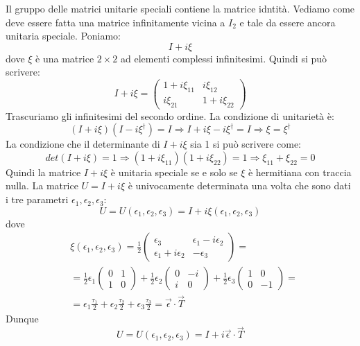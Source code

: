  Il gruppo delle matrici unitarie speciali contiene la
matrice idntità. Vediamo come deve essere fatta una matrice infinitamente 
vicina
a $I_2$ e tale da essere ancora unitaria speciale. Poniamo:
\[
I+i\xi
\]
dove $\xi$ è una matrice $2\times 2$ ad elementi complessi infinitesimi. Quindi
si può scrivere:
\[
I+i\xi=
\begin{pmatrix}
1+i\xi_{11} & i\xi_{12}\\
i\xi_{21} & 1+i\xi_{22}
\end{pmatrix}
\]
Trascuriamo gli infinitesimi del secondo ordine. La condizione di unitarietà 
è:
\begin{equation}
(I+i\xi)(I-i\xi^{\dagger})=I\Rightarrow I+i\xi-i\xi^{\dagger}=I\Rightarrow 
\xi=\xi^{\dagger}
\end{equation}
La condizione che il determinante di $I+i\xi$ sia 1 si può scrivere come:
\begin{equation}
det(I+i\xi)=1\Rightarrow (1+i\xi_{11})(1+i\xi_{22})=1\Rightarrow 
\xi_{11}+\xi_{22}=0
\end{equation}
Quindi la matrice $I+i\xi$ è unitaria speciale se e solo se $\xi$ è hermitiana
con traccia nulla. La matrice $U=I+i\xi$ è univocamente determinata una volta
che sono dati i tre parametri $\epsilon_1,\epsilon_2,\epsilon_3$:
\[
U=U(\epsilon_1,\epsilon_2,\epsilon_3)=I+i\xi(\epsilon_1,\epsilon_2,\epsilon_3)
\]
dove
\[
\begin{split}
&\xi(\epsilon_1,\epsilon_2,\epsilon_3)=\frac{1}{2}
\begin{pmatrix}
\epsilon_3 & \epsilon_1-i\epsilon_2\\
\epsilon_1+i\epsilon_2 & -\epsilon_3
\end{pmatrix}
=\\
&=\frac{1}{2}\epsilon_1
\begin{pmatrix}
0 & 1\\
1 & 0
\end{pmatrix}
+\frac{1}{2}\epsilon_2
\begin{pmatrix}
0 & -i\\
i & 0
\end{pmatrix}
+\frac{1}{2}\epsilon_3
\begin{pmatrix}
1 & 0\\
0 & -1
\end{pmatrix}
=\\
&=\epsilon_1\frac{\tau_1}{2}+\epsilon_2\frac{\tau_2}{2}+\epsilon_3\frac{\tau_3}{
2}=\vec{\epsilon}\cdot\vec{T}
\end{split}
\]
Dunque
\begin{equation}
U=U(\epsilon_1,\epsilon_2,\epsilon_3)=I+i\vec{\epsilon}\cdot\vec{T}
\end{equation}

